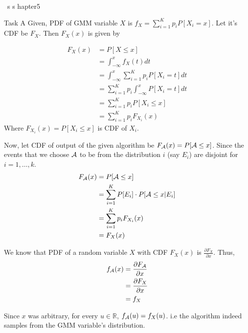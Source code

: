 \ s s hapter{5}
\begin{task}{Task A}
	Given, PDF of GMM variable $X$ is $f_X = \sum_{i=1}^K p_iP[X_i=x]$. Let
	it's CDF be $F_X$. Then $F_X(x)$ is given by

	\begin{align}
		F_X(x) & = P[X\leq x]                                    \\
		       & = \int_{-\infty}^{x} f_X(t)dt                   \\
		       & = \int_{-\infty}^{x} \sum_{i=1}^K p_iP[X_i=t]dt \\
		       & = \sum_{i=1}^K p_i\int_{-\infty}^{x} P[X_i=t]dt \\
		       & = \sum_{i=1}^K p_iP[X_i\leq x]                  \\
		       & = \sum_{i=1}^K p_iF_{X_i}(x)
	\end{align}
	Where $F_{X_i}(x) = P[X_i\leq x]$ is CDF of $X_i$.

	Now, let CDF of output of the given algorithm be
	$F_{\mathcal{A}}(x) = P[\mathcal{A}\leq x]$. Since the events that we choose $\mathcal{A}$ to be
	from the distribution $i$ (say $E_i$) are disjoint for $i=1,\dots,k$.
	\begin{align}
		F_{\mathcal{A}}(x) & = P[\mathcal{A}\leq x]                                \\
		        & = \sum_{i=1}^K P[E_i]\cdot P[\mathcal{A}\leq x | E_i] \\
		        & = \sum_{i=1}^K p_iF_{X_i}(x)                 \\
		        & = F_X(x)
	\end{align}

	We know that PDF of a random variable $X$ with CDF $F_X(x)$ is
	$\frac{\partial F_X}{\partial x}$. Thus,
	\begin{align}
		f_{\mathcal{A}}(x) & = \frac{\partial F_{\mathcal{A}}}{\partial x} \\
		        & = \frac{\partial F_X}{\partial x}  \\
		        & = f_X
	\end{align}

	Since $x$ was arbitrary, for every $u\in\mathbb{R}$, $f_{\mathcal{A}}(u) =
		f_X(u)$. i.e the algorithm indeed samples from the GMM variable's
	distribution.
\end{task}



